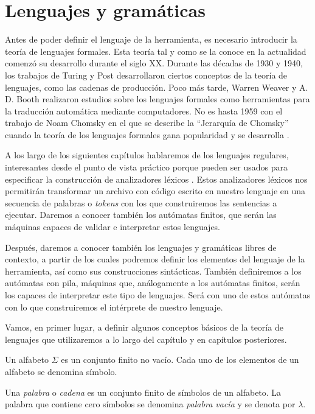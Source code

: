 
\chapter{Lenguajes y gramáticas}\label{chap:leng}

Antes de poder definir el lenguaje de la herramienta, es necesario introducir la teoría de lenguajes formales. Esta 
teoría tal y como se la conoce en la actualidad comenzó su desarrollo durante el siglo XX. Durante las décadas de 1930 
y 1940, los trabajos de Turing y Post desarrollaron ciertos conceptos de la teoría de lenguajes, como las cadenas de 
producción. Poco más tarde, Warren Weaver y A. D. Booth realizaron estudios sobre los lenguajes formales como 
herramientas para la traducción automática mediante computadores. No es hasta 1959 con el trabajo de Noam Chomsky en 
el que se describe la ``Jerarquía de Chomsky'' cuando la teoría de los lenguajes formales gana popularidad y se 
desarrolla \cite{greibach_1981_formal}.

\vspace{10pt}
A los largo de los siguientes capítulos hablaremos de los lenguajes regulares, interesantes desde el punto de vista 
práctico porque pueden ser usados para especificar la construcción de analizadores léxicos \cite{kelley_2001}. Estos 
analizadores léxicos nos permitirán transformar un archivo con código escrito en nuestro lenguaje en una secuencia de 
palabras o \textit{tokens} con los que construiremos las sentencias a ejecutar. Daremos a conocer también los autómatas
finitos, que serán las máquinas capaces de validar e interpretar estos lenguajes.

\vspace{10pt}
Después, daremos a conocer también los lenguajes y gramáticas libres de contexto, a partir de los cuales podremos 
definir los elementos del lenguaje de la herramienta, así como sus construcciones sintácticas. También definiremos a
los autómatas con pila, máquinas que, análogamente a los autómatas finitos, serán los capaces de interpretar este tipo
de lenguajes. Será con uno de estos autómatas con lo que construiremos el intérprete de nuestro lenguaje.

\vspace{10pt}
Vamos, en primer lugar, a definir algunos conceptos básicos de la teoría de lenguajes que utilizaremos a lo largo del 
capítulo y en capítulos posteriores.

\begin{definicion}[Alfabeto] Un alfabeto $\Sigma$ es un conjunto finito no vacío. Cada uno de los elementos de un 
alfabeto se denomina símbolo.
\end{definicion}
\begin{definicion}[Palabra] Una \textit{palabra} o \textit{cadena} es un conjunto finito de símbolos de un alfabeto. 
La palabra que contiene cero símbolos se denomina \textit{palabra vacía} y se denota por $\lambda$.
\end{definicion}

